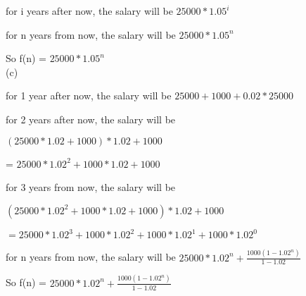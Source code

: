 \documentclass{article}
\begin{document}
\begin{large}
\indent\indent    for i years after now, the salary will be $25000 * 1.05^i$

\indent\indent    for n years from now, the salary will be $25000 * 1.05^n$

\indent So f(n) = $25000 * 1.05^n$\\

(c) 

\indent\indent for 1 year after now, the salary will be $25000 + 1000 + 0.02 * 25000$

\indent\indent for 2 years after now, the salary will be 

\indent\indent $(25000 * 1.02 + 1000) * 1.02 + 1000$

\indent\indent                                             = $25000 * 1.02^2 + 1000 * 1.02 + 1000$
                                             
\indent\indent    for 3 years from now, the salary will be 

\indent\indent $(25000 * 1.02^2 + 1000 * 1.02 + 1000) * 1.02 + 1000$
    
\indent\indent                                           $ = 25000 * 1.02^3 + 1000 * 1.02^2 + 1000 * 1.02^1 + 1000 * 1.02^0$
                                           
\indent\indent    for n years from now, the salary will be $25000 * 1.02^n + \frac {1000 (1 - 1.02^n)}{1 - 1.02}$

\indent    So f(n) = $25000 * 1.02^n + \frac {1000 (1 - 1.02^n)}{1 - 1.02}$

\end{large}
\end{document}
